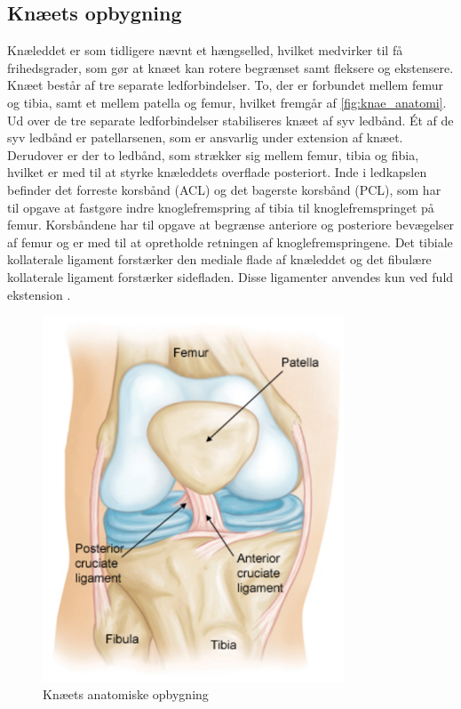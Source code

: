 \subsection{Knæets opbygning}
Knæleddet er som tidligere nævnt et hængselled, hvilket medvirker til få frihedsgrader, som gør at knæet kan rotere begrænset samt fleksere og ekstensere.
Knæet består af tre separate ledforbindelser. To, der er forbundet mellem femur og tibia, samt et mellem patella og femur, hvilket fremgår af \autoref{fig:knae_anatomi}. Ud over de tre separate ledforbindelser stabiliseres knæet af syv ledbånd. Ét af de syv ledbånd er patellarsenen, som er ansvarlig under extension af knæet. Derudover er der to ledbånd, som strækker sig mellem femur, tibia og fibia, hvilket er med til at styrke knæleddets overflade posteriort. Inde i ledkapslen befinder det forreste korsbånd (ACL) og det bagerste korsbånd (PCL), som har til opgave at fastgøre indre knoglefremspring af tibia til knoglefremspringet på femur. Korsbåndene har til opgave at begrænse anteriore og posteriore bevægelser af femur og er med til at opretholde retningen af knoglefremspringene. Det tibiale kollaterale ligament forstærker den mediale flade af knæleddet og det fibulære kollaterale ligament forstærker sidefladen. Disse ligamenter anvendes kun ved fuld ekstension \citep{martini2012}.

\begin{figure}[H]
\centering
\includegraphics[width=0.8\textwidth]{figures/knae_anatomi}
\caption{Knæets anatomiske opbygning \citep{martini2012}}
\label{fig:knae_anatomi}
\end{figure} 

